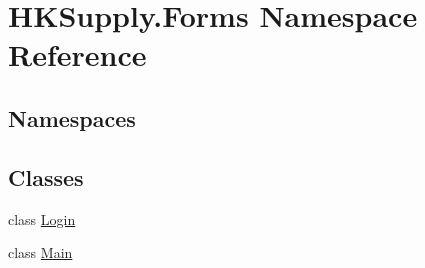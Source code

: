 \hypertarget{namespace_h_k_supply_1_1_forms}{}\section{H\+K\+Supply.\+Forms Namespace Reference}
\label{namespace_h_k_supply_1_1_forms}
\subsection*{Namespaces}
\begin{DoxyCompactItemize}
\end{DoxyCompactItemize}
\subsection*{Classes}
\begin{DoxyCompactItemize}
\item 
class \hyperlink{class_h_k_supply_1_1_forms_1_1_login}{Login}
\item 
class \hyperlink{class_h_k_supply_1_1_forms_1_1_main}{Main}
\end{DoxyCompactItemize}
